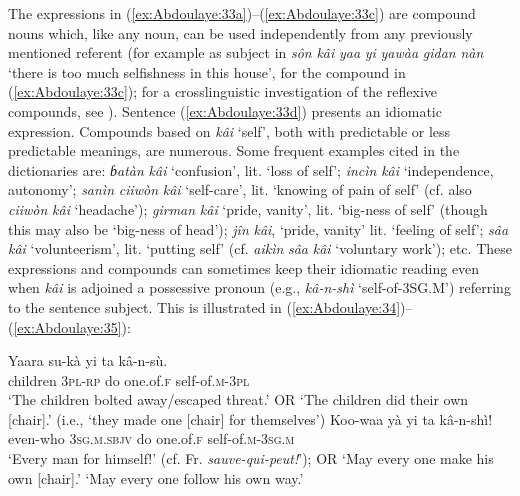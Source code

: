 \documentclass[output=paper]{langscibook}
\begin{document}
        


The expressions in (\ref{ex:Abdoulaye:33a})--(\ref{ex:Abdoulaye:33c}) are compound nouns which, like any noun, can be used independently from any previously mentioned referent (for example as subject in \textit{sôn} \textit{kâi} \textit{yaa} \textit{yi} \textit{yawàa} \textit{gidan} \textit{nàn} ‘there is too much selfishness in this house’, for the compound in (\ref{ex:Abdoulaye:33c}); for a crosslinguistic investigation of the reflexive compounds, see \citealt{Koenig2003}). Sentence (\ref{ex:Abdoulaye:33d}) presents an idiomatic expression. Compounds based on \textit{kâi} ‘self’, both with predictable or less predictable meanings, are numerous. Some frequent examples cited in the dictionaries are: \textit{ɓatàn} \textit{kâi} ‘confusion’, lit. ‘loss of self’; \textit{incìn} \textit{kâi} ‘independence, autonomy’; \textit{sanìn} \textit{ciiwòn} \textit{kâi} ‘self-care’, lit. ‘knowing of pain of self’ (cf. also \textit{ciiwòn} \textit{kâi} ‘headache’); \textit{girman} \textit{kâi} ‘pride, vanity’, lit. ‘big-ness of self’ (though this may also be  ‘big-ness of head’); \textit{jîn} \textit{kâi}, ‘pride, vanity’ lit. ‘feeling of self’; \textit{sâa} \textit{kâi} ‘volunteerism’, lit. ‘putting self’ (cf. \textit{aikìn} \textit{sâa} \textit{kâi} ‘voluntary work’); etc. These expressions and compounds can sometimes keep their idiomatic reading even when \textit{kâi} is adjoined a possessive pronoun (e.g., \textit{kâ-n-shì} ‘self-of-3SG.M’) referring to the sentence subject. This is illustrated in (\ref{ex:Abdoulaye:34})--(\ref{ex:Abdoulaye:35}):


\ea%
    \label{ex:Abdoulaye:34}
    \ea \label{ex:Abdoulaye:34a}
    \gll Yaara  su-kà  yi  ta  kâ-n-sù.\\
    children  \textsc{3pl-rp}  do  one.of.\textsc{f}  self-of.\textsc{m-3pl}\\
    \glt `The children bolted away/escaped threat.’ OR `The children did their own [chair].’ (i.e., ‘they made one [chair] for themselves’)
    \ex \label{ex:Abdoulaye:34b}
    \gll Koo-waa  yà  yi  ta  kâ-n-shì!\\
    even-who  \textsc{3sg.m.sbjv}  do  one.of.\textsc{f}  self-of.\textsc{m-3sg.m}\\
    \glt `Every man for himself!’ (cf. Fr. \textit{sauve-qui-peut!}’); OR `May every one make his own [chair].’  ‘May every one follow his own way.’
    \z
\z

        
\end{document}
